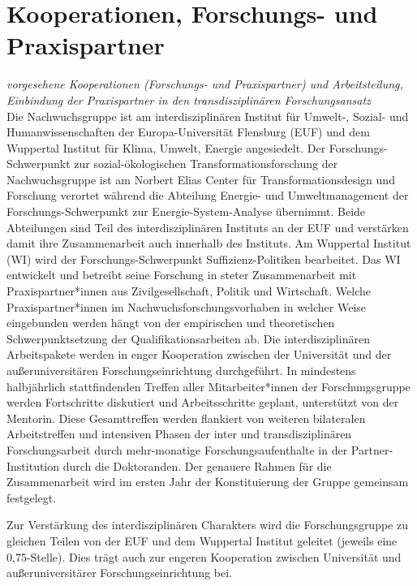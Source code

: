 \documentclass[a4paper,11pt,twoside]{scrartcl}
\begin{document}
\section{Kooperationen, Forschungs- und Praxispartner}
\textit{vorgesehene Kooperationen (Forschungs- und Praxispartner) und Arbeitsteilung, Einbindung der Praxispartner in den transdisziplinären Forschungsansatz}\\

Die Nachwuchsgruppe ist am interdisziplinären Institut für Umwelt-, Sozial- und Humanwissenschaften der Europa-Universität Flensburg (EUF) und dem Wuppertal Institut für Klima, Umwelt, Energie angesiedelt. Der Forschungs-Schwerpunkt zur sozial-ökologischen Transformationsforschung der Nachwuchsgruppe ist am Norbert Elias Center für Transformationsdesign und Forschung verortet während die Abteilung Energie- und Umweltmanagement der Forschungs-Schwerpunkt zur Energie-System-Analyse übernimmt. Beide Abteilungen sind Teil des interdisziplinären Instituts an der EUF und verstärken damit ihre Zusammenarbeit auch innerhalb des Instituts. Am Wuppertal Institut (WI) wird der Forschungs-Schwerpunkt Suffizienz-Politiken bearbeitet. Das WI entwickelt und betreibt seine Forschung in steter Zusammenarbeit mit Praxispartner*innen aus Zivilgesellschaft, Politik und Wirtschaft. Welche Praxispartner*innen im Nachwuchsforschungsvorhaben in welcher Weise eingebunden werden hängt von der empirischen und theoretischen Schwerpunktsetzung der Qualifikationsarbeiten ab. Die interdisziplinären Arbeitspakete werden in enger Kooperation zwischen der Universität und der außeruniversitären Forschungseinrichtung durchgeführt. In mindestens halbjährlich stattfindenden Treffen aller Mitarbeiter*innen der Forschungsgruppe werden Fortschritte diskutiert und Arbeitsschritte geplant, unterstützt von der Mentorin. Diese Gesamttreffen werden flankiert von weiteren bilateralen Arbeitstreffen und intensiven Phasen der inter und transdisziplinären Forschungsarbeit durch mehr-monatige Forschungsaufenthalte in der Partner-Institution durch die Doktoranden. Der genauere Rahmen für die Zusammenarbeit wird im ersten Jahr der Konstituierung der Gruppe gemeinsam festgelegt.

Zur Verstärkung des interdisziplinären Charakters wird die Forschungsgruppe zu gleichen Teilen von der EUF und dem Wuppertal Institut geleitet (jeweils eine 0,75-Stelle). Dies trägt auch zur engeren Kooperation zwischen Universität und außeruniversitärer Forschungseinrichtung bei.
\end{document}
